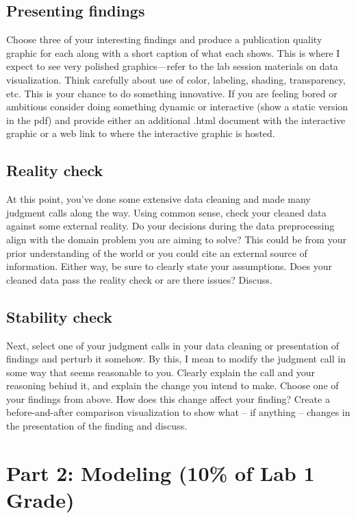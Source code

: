 \documentclass[10pt,letterpaper]{article}
\begin{document}
\subsection*{Presenting findings}

Choose three of your interesting findings and produce a publication quality graphic for each along with a short caption of what each shows. This is where I expect to see very polished graphics---refer to the lab session materials on data visualization. Think carefully about use of color, labeling, shading, transparency, etc. This is your chance to do something innovative. If you are feeling bored or ambitious consider doing something dynamic or interactive (show a static version in the pdf) and provide either an additional .html document with the interactive graphic or a web link to where the interactive graphic is hosted.

\subsection*{Reality check}

At this point, you’ve done some extensive data cleaning and made many judgment calls along the way. Using common sense, check your cleaned data against some external reality. Do your decisions during the data preprocessing align with the domain problem you are aiming to solve? This could be from your prior understanding of the world or you could cite an external source of information. Either way, be sure to clearly state your assumptions. Does your cleaned data pass the reality check or are there issues? Discuss.

\subsection*{Stability check}

Next, select one of your judgment calls in your data cleaning or presentation of findings and perturb it somehow. By this, I mean to modify the judgment call in some way that seems reasonable to you. Clearly explain the call and your reasoning behind it, and explain the change you intend to make. Choose one of your findings from above. How does this change affect your finding? Create a before-and-after comparison visualization to show what – if anything – changes in the presentation of the finding and discuss.

\section*{Part 2: Modeling (10\% of Lab 1 Grade)}
\end{document}

